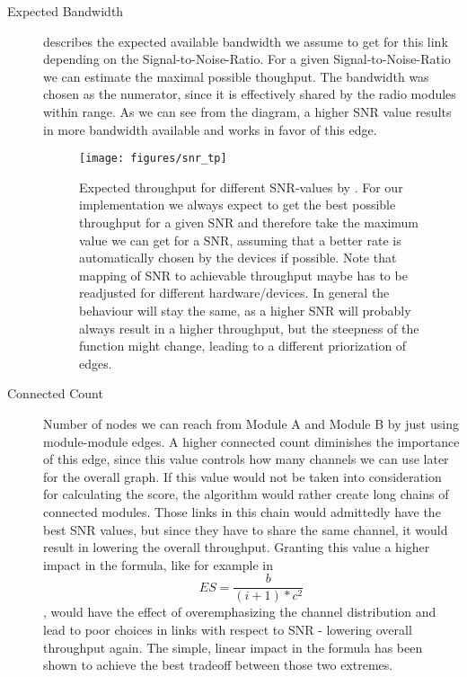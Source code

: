   \begin{description}
    \item[Expected Bandwidth]
    describes the expected available bandwidth we assume to get for this link depending on the Signal-to-Noise-Ratio.
    For a given Signal-to-Noise-Ratio we can estimate the maximal possible thoughput.
    The bandwidth was chosen as the numerator, since it is effectively shared by the radio modules within range.
    As we can see from the diagram, a higher SNR value results in more bandwidth available and works in favor of this edge.
    \begin{figure}[h]
      \centering
      \texttt{[image: figures/snr\_tp]}
      \caption{Expected throughput for different \ac{SNR}-values by \cite{expected_snr}. For our implementation we always expect to get the best possible
      throughput for a given SNR and therefore take the maximum value we can get for a SNR, assuming that a better rate is automatically chosen by the devices if possible.
      Note that mapping of SNR to achievable throughput maybe has to be readjusted for different hardware/devices. In general the behaviour will stay the same, as 
      a higher SNR will probably always result in a higher throughput, but the steepness of the function might change, leading to a different priorization of edges.}
      \label{fig:snr_tp}
    \end{figure}
    \item[Connected Count]
    Number of nodes we can reach from Module A and Module B by just using module-module edges. 
    A higher connected count diminishes the importance of this edge, since this value controls how many channels we can use later for the overall graph.
    If this value would not be taken into consideration for calculating the score, the algorithm would rather create long chains of connected modules. 
    Those links in this chain would admittedly have the best SNR values, but since they have to share the same channel, it would result in lowering the overall throughput.
    Granting this value a higher impact in the formula, like for example in 
    \begin{equation}
      ES=\frac{b}{(i + 1)* c^2}
    \end{equation}
    , would have the effect of overemphasizing 
    the channel distribution and lead to poor choices in links with respect to SNR - lowering overall throughput again.
    The simple, linear impact in the formula has been shown to achieve the best tradeoff between those two extremes.
    

\end{description}

